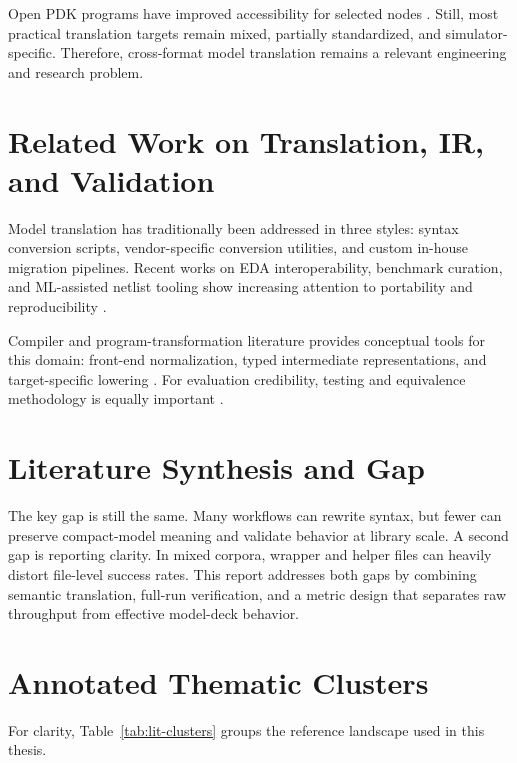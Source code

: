 \documentclass[12pt,a4paper,oneside]{report}
\begin{document}
Open PDK programs have improved accessibility for selected nodes \cite{openpdk,sky130_pdk,gf180_pdk,asap7_pdk,freepdk45}. Still, most practical translation targets remain mixed, partially standardized, and simulator-specific. Therefore, cross-format model translation remains a relevant engineering and research problem.

\section{Related Work on Translation, IR, and Validation}
Model translation has traditionally been addressed in three styles: syntax conversion scripts, vendor-specific conversion utilities, and custom in-house migration pipelines. Recent works on EDA interoperability, benchmark curation, and ML-assisted netlist tooling show increasing attention to portability and reproducibility \cite{eda_interop,eda_standards,cad_flow_survey,llm_eda_dataset,autospice,edacurry,translation_limits,software_lockin}.

Compiler and program-transformation literature provides conceptual tools for this domain: front-end normalization, typed intermediate representations, and target-specific lowering \cite{compiler_dragon,llvm_ir,program_transformations}. For evaluation credibility, testing and equivalence methodology is equally important \cite{equiv_checking,formal_methods_sim,software_testing,continuous_integration,scientific_workflows,reproducibility_science,benchmarking_mlsys,robust_statistics,uncertainty_quantification}.

\section{Literature Synthesis and Gap}
The key gap is still the same. Many workflows can rewrite syntax, but fewer can preserve compact-model meaning and validate behavior at library scale. A second gap is reporting clarity. In mixed corpora, wrapper and helper files can heavily distort file-level success rates. This report addresses both gaps by combining semantic translation, full-run verification, and a metric design that separates raw throughput from effective model-deck behavior.

\section{Annotated Thematic Clusters}
For clarity, Table~\ref{tab:lit-clusters} groups the reference landscape used in this thesis.
\end{document}
